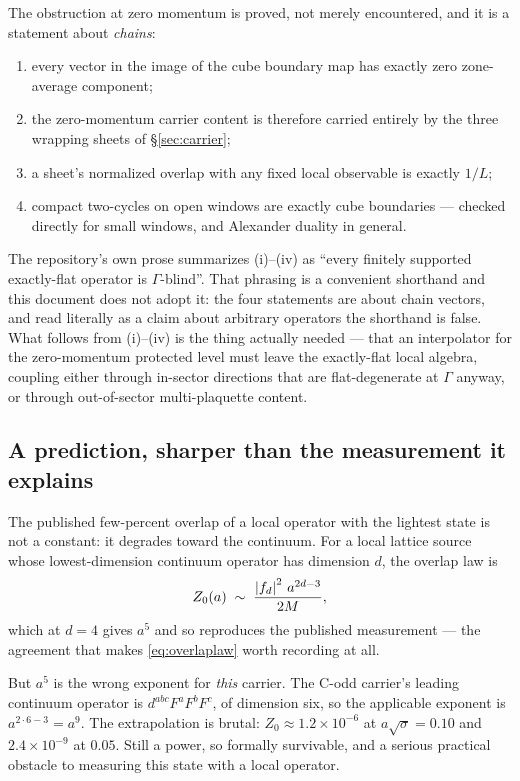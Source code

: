 The obstruction at zero momentum is proved, not merely encountered, and
it is a statement about \emph{chains}:
\begin{enumerate}
  \item every vector in the image of the cube boundary map has exactly
    zero zone-average component;
  \item the zero-momentum carrier content is therefore carried entirely
    by the three wrapping sheets of \S\ref{sec:carrier};
  \item a sheet's normalized overlap with any fixed local observable is
    exactly $1/L$;
  \item compact two-cycles on open windows are exactly cube boundaries
    --- checked directly for small windows, and Alexander duality in
    general.
\end{enumerate}
The repository's own prose summarizes (i)--(iv) as ``every finitely
supported exactly-flat operator is $\Gamma$-blind''. That phrasing is a
convenient shorthand and this document does not adopt it: the four
statements are about chain vectors, and read literally as a claim about
arbitrary operators the shorthand is false. What follows from (i)--(iv)
is the thing actually needed --- that an interpolator for the
zero-momentum protected level must leave the exactly-flat local algebra,
coupling either through in-sector directions that are flat-degenerate at
$\Gamma$ anyway, or through out-of-sector multi-plaquette content.

\subsection{A prediction, sharper than the measurement it explains}

The published few-percent overlap of a local operator with the lightest
state is not a constant: it degrades toward the continuum. For a local
lattice source whose lowest-dimension continuum operator has dimension
$d$, the overlap law is
\begin{equation}
  Z_0(a) \;\sim\; \frac{\left\lvert f_d \right\rvert^2\, a^{2d-3}}{2M},
  \label{eq:overlaplaw}
\end{equation}
which at $d = 4$ gives $a^5$ and so reproduces the published
measurement --- the agreement that makes \eqref{eq:overlaplaw} worth
recording at all.

But $a^5$ is the wrong exponent for \emph{this} carrier. The C-odd
carrier's leading continuum operator is $d^{abc}F^aF^bF^c$, of dimension
six, so the applicable exponent is $a^{2\cdot 6-3} = a^9$. The
extrapolation is brutal: $Z_0 \approx 1.2\times10^{-6}$ at
$a\sqrt\sigma = 0.10$ and $2.4\times10^{-9}$ at $0.05$. Still a power,
so formally survivable, and a serious practical obstacle to measuring
this state with a local operator.

